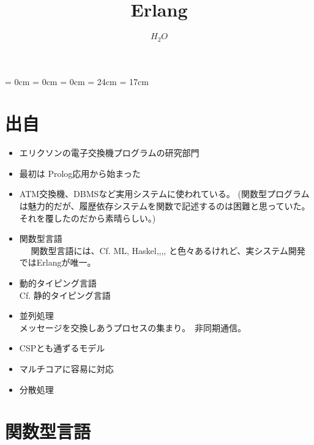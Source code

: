 


\topmargin = 0cm
\oddsidemargin = 0cm
\evensidemargin = 0cm
\textheight = 24cm
\textwidth = 17cm

\setcounter{secnumdepth}{2}



\title{\Large\bf  Erlang  }

\author{$H_2O$}



\maketitle

\section{出自}

\begin{itemize}

\item エリクソンの電子交換機プログラムの研究部門
\item 最初は Prolog応用から始まった
\item ATM交換機、DBMSなど実用システムに使われている。
     (関数型プログラムは魅力的だが、履歴依存システムを関数で記述するのは困難と思っていた。
      それを覆したのだから素晴らしい。)
\item 関数型言語 \\
  　   関数型言語には、Cf. ML, Haskel,,,, と色々あるけれど、実システム開発ではErlangが唯一。
\item 動的タイピング言語     \\
   Cf.  静的タイピング言語
\item 並列処理 \\
      メッセージを交換しあうプロセスの集まり。　非同期通信。
\item  CSPとも通ずるモデル
\item  マルチコアに容易に対応
\item 分散処理
\end{itemize}

  
\section{関数型言語}

